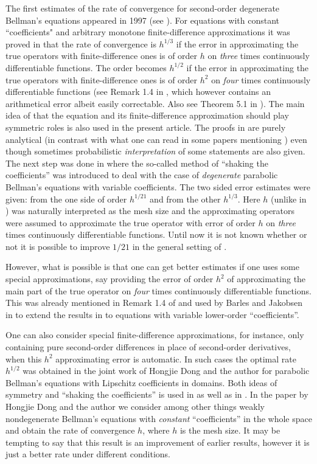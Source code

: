 \documentclass[11pt, reqno]{amsart}
\theoremstyle{definition}
\theoremstyle{remark}
\begin{document}
The first estimates of the rate of convergence
for second-order degenerate Bellman's equations appeared  in 1997
(see \cite{Kr97}). For equations with constant ``coefficients"
and arbitrary monotone  finite-difference approximations
it was proved in \cite{Kr97} that the rate of convergence
is $h^{1/3}$ if the error in approximating the true operators with
finite-difference ones is of order $h$ on {\em
three\/} times continuously differentiable functions. 
The order becomes
$h^{1/2}$ if the error in approximating the true operators with
finite-difference ones is of order $h^{2}$
on {\em four\/} times continuously differentiable functions
(see Remark 1.4 in \cite{Kr97}, which however contains
an arithmetical error albeit easily correctable. Also see
 Theorem 5.1 in \cite{Kr97}).
The main idea of \cite{Kr97} that the equation and its 
finite-difference approximation should play symmetric
roles is also used in the present article. The proofs
in \cite{Kr97} are purely analytical (in contrast with what
one can read in some papers mentioning \cite{Kr97}) 
even though sometimes probabilistic
{\em interpretation\/} of some statements are also given.
The next step was done in \cite{Kr99} where the 
so-called method of ``shaking  the coefficients''
was introduced to deal with the case of {\em degenerate\/}
parabolic Bellman's equations with variable coefficients.
The two sided error estimates were given: from the one side
of order $h^{1/21}$ and from the other $h^{1/3}$. Here $h$
(unlike in \cite{Kr97})
was naturally interpreted as the mesh size and
the approximating operators were assumed to approximate
the true operator with error of order $h$ on {\em three\/}
times continuously differentiable functions. Until now
it is not known whether or not it is possible to improve $1/21$
in the general setting of \cite{Kr99}.

However, what is possible is that one can get better
estimates if one uses some special approximations,
say providing the error 
  of order $h^{2}$ of approximating the main part of the
true operator
on {\em four\/} times continuously differentiable functions.
This was already mentioned in  Remark 1.4 of \cite{Kr97}
and  used by Barles and Jakobsen in \cite{BJ02}
to extend the results in \cite{Kr97} to  
equations with variable lower-order ``coefficients''.

One can also consider  special finite-difference
approximations, for instance, only containing
pure second-order differences in place of second-order
derivatives, when this $h^{2}$
approximating error is automatic. In such cases
the optimal rate $h^{1/2}$ was obtained in the joint
work of Hongjie Dong and the author \cite{DK07}
for
parabolic Bellman's equations with Lipschitz
coefficients in domains.
Both ideas of symmetry and   ``shaking the coefficients''
is used in \cite{DK07} as well as in \cite{DK05}.
In the paper by Hongjie Dong and the author \cite{DK05}
we consider among other things weakly nondegenerate
Bellman's equations with {\em constant\/} ``coefficients''
in the whole space
and obtain the rate of convergence $h$, where
$h$ is the mesh size. It may be tempting to say
that this result is an improvement of earlier
results, however it is just a better rate 
under different conditions.
\end{document}
